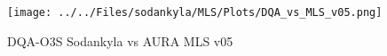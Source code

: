                                 \begin{figure}
        \centering
\texttt{[image: ../../Files/sodankyla/MLS/Plots/DQA\_vs\_MLS\_v05.png]}
    \caption{DQA-O3S Sodankyla vs AURA MLS v05 }
            \label{fig:o3sv05}
    \end{figure}











%
%

